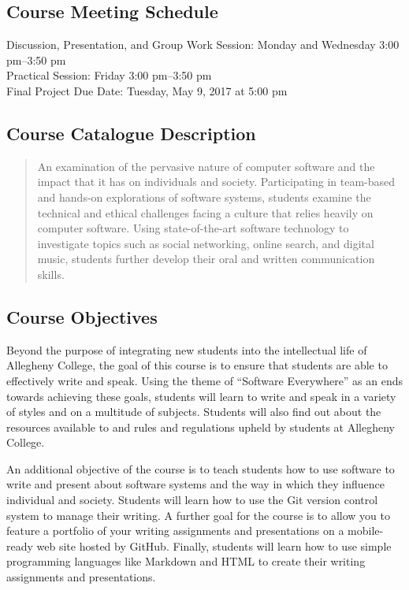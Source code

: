 \subsection*{Course Meeting Schedule}

Discussion, Presentation, and Group Work Session: Monday and Wednesday 3:00 pm--3:50 pm \\
Practical Session: Friday 3:00 pm--3:50 pm \\
Final Project Due Date: Tuesday, May 9, 2017 at 5:00 pm

\subsection*{Course Catalogue Description}

\begin{quote}

  An examination of the pervasive nature of computer software and the impact that it has on individuals and society.
  Participating in team-based and hands-on explorations of software systems, students examine the technical and ethical
  challenges facing a culture that relies heavily on computer software. Using state-of-the-art software technology to
  investigate topics such as social networking, online search, and digital music, students further develop their oral and
  written communication skills.

\end{quote}

\subsection*{Course Objectives}

Beyond the purpose of integrating new students into the intellectual life of Allegheny College, the goal of this course
is to ensure that students are able to effectively write and speak. Using the theme of ``Software Everywhere'' as an
ends towards achieving these goals, students will learn to write and speak in a variety of styles and on a multitude of
subjects. Students will also find out about the resources available to and rules and regulations upheld by students at
Allegheny College.

An additional objective of the course is to teach students how to use software to write and present about software
systems and the way in which they influence individual and society. Students will learn how to use the Git version
control system to manage their writing. A further goal for the course is to allow you to feature a portfolio of your
writing assignments and presentations on a mobile-ready web site hosted by GitHub. Finally, students will learn how to
use simple programming languages like Markdown and HTML to create their writing assignments and presentations.

